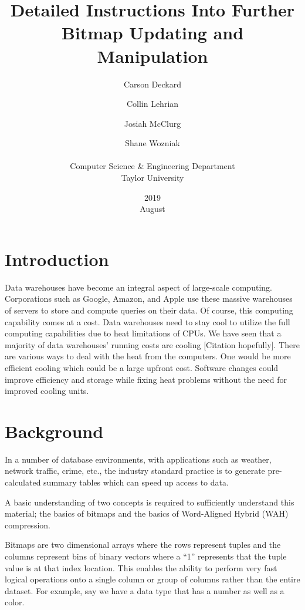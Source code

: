 \documentclass{article}
\title{Detailed Instructions Into Further Bitmap Updating and Manipulation}
\date{2019 \\ August }
\author{Carson Deckard \and Collin Lehrian \and Josiah McClurg \and Shane Wozniak \\ \\ Computer Science \&  Engineering Department \\ Taylor University}
\begin{document}
\maketitle

%
%
\section{Introduction}
\justify
Data warehouses have become an integral aspect of large-scale computing. Corporations such as Google, Amazon, and Apple use these massive warehouses of servers to store and compute queries on their data. Of course, this computing capability comes at a cost. Data warehouses need to stay cool to utilize the full computing capabilities due to heat limitations of CPUs. We have seen that a majority of data warehouses' running costs are cooling [Citation hopefully].
There are various ways to deal with the heat from the computers. One would be more efficient cooling which could be a large upfront cost. Software changes could improve efficiency and storage while fixing heat problems without the need for improved cooling units.
%
%
\section{Background}
\justify

In a number of database environments, with applications such as weather, network traffic, crime, etc., %
the industry standard practice is to generate pre-calculated summary tables which can speed up access to data.\par

A basic understanding of two concepts is required to sufficiently understand this material; the basics of bitmaps and the basics of Word-Aligned Hybrid (WAH) compression. \par

Bitmaps are two dimensional arrays where the rows represent tuples and the columns represent bins of binary vectors where a “1” represents that the tuple value is at that index location. This enables the ability to perform very fast logical operations onto a single column or group of columns rather than the entire dataset. For example, say we have a data type that has a number as well as a color. \par
\end{document}
